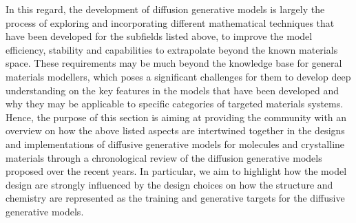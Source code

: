 In this regard, the development of diffusion generative models is largely the process of exploring and incorporating different mathematical techniques that have been developed for the subfields listed above, to improve the model efficiency, stability and capabilities to extrapolate beyond the known materials space. These requirements may be much beyond the knowledge base for general materials modellers, which poses a significant challenges for them to develop deep understanding on the key features in the models that have been developed and why they may be applicable to specific categories of targeted materials systems. Hence, the purpose of this section is aiming at providing the community with an overview on how the above listed aspects are intertwined together in the designs and implementations of diffusive generative models for molecules and crystalline materials through a chronological review of the diffusion generative models proposed over the recent years. In particular, we aim to highlight how the model design are strongly influenced by the design choices on how the structure and chemistry are represented as the training and generative targets for the diffusive generative models.

